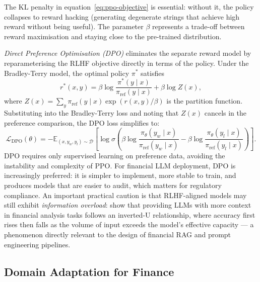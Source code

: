 \begin{deepdive}
The KL penalty in equation~\eqref{eq:ppo-objective} is essential: without it,
the policy collapses to reward hacking (generating degenerate strings that
achieve high reward without being useful).  The parameter $\beta$ represents
a trade-off between reward maximisation and staying close to the pre-trained
distribution.

\emph{Direct Preference Optimisation (DPO)} \cite{rafailov2023direct} eliminates
the separate reward model by reparameterising the RLHF objective directly in
terms of the policy.  Under the Bradley-Terry model, the optimal policy
$\pi^*$ satisfies
\begin{equation}
  r^*(x, y) = \beta \log \frac{\pi^*(y \mid x)}{\pi_{\mathrm{ref}}(y \mid x)} + \beta \log Z(x),
  \label{eq:dpo-reward}
\end{equation}
where $Z(x) = \sum_y \pi_{\mathrm{ref}}(y \mid x) \exp(r(x,y)/\beta)$ is
the partition function.  Substituting into the Bradley-Terry loss and noting
that $Z(x)$ cancels in the preference comparison, the DPO loss simplifies to:
\begin{equation}
  \mathcal{L}_{\mathrm{DPO}}(\theta) = -\mathbb{E}_{(x, y_w, y_l) \sim \mathcal{D}}
    \!\left[\log \sigma\!\left(
      \beta \log \frac{\pi_\theta(y_w \mid x)}{\pi_{\mathrm{ref}}(y_w \mid x)}
      - \beta \log \frac{\pi_\theta(y_l \mid x)}{\pi_{\mathrm{ref}}(y_l \mid x)}
    \right)\right].
  \label{eq:dpo}
\end{equation}
DPO requires only supervised learning on preference data, avoiding the
instability and complexity of PPO.  For financial LLM deployment, DPO is
increasingly preferred: it is simpler to implement, more stable to train, and
produces models that are easier to audit, which matters for regulatory compliance.
An important practical caution is that RLHF-aligned models may still exhibit
\emph{information overload}: \citet{BaloghDidisheim2025} show that providing
LLMs with more context in financial analysis tasks follows an inverted-U
relationship, where accuracy first rises then falls as the volume of input
exceeds the model's effective capacity --- a phenomenon directly relevant to
the design of financial RAG and prompt engineering pipelines.

\subsection{Domain Adaptation for Finance}
\label{subsec:domain-adaptation}


\end{deepdive}
